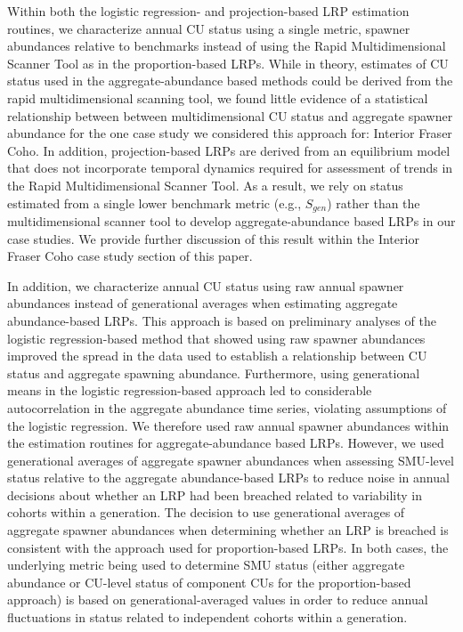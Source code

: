 \documentclass[11pt]{book}
\begin{document}
Within both the logistic regression- and projection-based LRP estimation routines, we characterize annual CU status using a single metric, spawner abundances relative to benchmarks instead of using the Rapid Multidimensional Scanner Tool as in the proportion-based LRPs. While in theory, estimates of CU status used in the aggregate-abundance based methods could be derived from the rapid multidimensional scanning tool, we found little evidence of a statistical relationship between between multidimensional CU status and aggregate spawner abundance for the one case study we considered this approach for: Interior Fraser Coho. In addition, projection-based LRPs are derived from an equilibrium model that does not incorporate temporal dynamics required for assessment of trends in the Rapid Multidimensional Scanner Tool. As a result, we rely on status estimated from a single lower benchmark metric (e.g., \(S_{gen}\)) rather than the multidimensional scanner tool to develop aggregate-abundance based LRPs in our case studies. We provide further discussion of this result within the Interior Fraser Coho case study section of this paper.

In addition, we characterize annual CU status using raw annual spawner abundances instead of generational averages when estimating aggregate abundance-based LRPs. This approach is based on preliminary analyses of the logistic regression-based method that showed using raw spawner abundances improved the spread in the data used to establish a relationship between CU status and aggregate spawning abundance. Furthermore, using generational means in the logistic regression-based approach led to considerable autocorrelation in the aggregate abundance time series, violating assumptions of the logistic regression. We therefore used raw annual spawner abundances within the estimation routines for aggregate-abundance based LRPs. However, we used generational averages of aggregate spawner abundances when assessing SMU-level status relative to the aggregate abundance-based LRPs to reduce noise in annual decisions about whether an LRP had been breached related to variability in cohorts within a generation. The decision to use generational averages of aggregate spawner abundances when determining whether an LRP is breached is consistent with the approach used for proportion-based LRPs. In both cases, the underlying metric being used to determine SMU status (either aggregate abundance or CU-level status of component CUs for the proportion-based approach) is based on generational-averaged values in order to reduce annual fluctuations in status related to independent cohorts within a generation.
\end{document}
